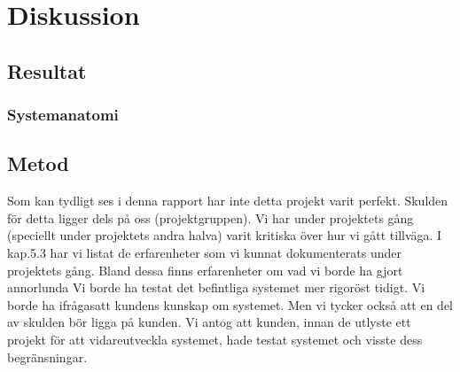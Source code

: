 \chapter{Diskussion}
\label{cha:discussion}

\section{Resultat}
\label{sec:discussion-results}


\subsection{Systemanatomi}



\section{Metod}
\label{sec:discussion-method}
Som kan tydligt ses i denna rapport har inte detta projekt varit perfekt. Skulden för detta ligger dels på oss (projektgruppen). Vi har under projektets gång (speciellt under projektets andra halva) varit kritiska över hur vi gått tillväga. I kap.5.3 har vi listat de erfarenheter som vi kunnat dokumenterats under projektets gång. Bland dessa finns erfarenheter om vad vi borde ha gjort annorlunda Vi borde ha testat det befintliga systemet mer rigoröst tidigt. Vi borde ha ifrågasatt kundens kunskap om systemet. Men vi tycker också att en del av skulden bör ligga på kunden. Vi antog att kunden, innan de utlyste ett projekt för att vidareutveckla systemet, hade testat systemet och visste dess begränsningar.

